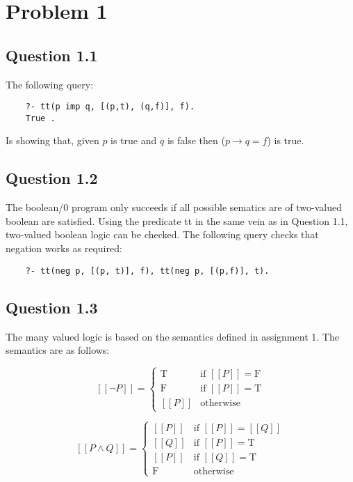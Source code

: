 \newpage
\section*{Problem 1}

\subsection*{Question 1.1}
The following query:

\begin{verbatim}
    ?- tt(p imp q, [(p,t), (q,f)], f).
    True .
\end{verbatim}

Is showing that, given $p$ is true and $q$ is false then ($p \to q = f$) is true. 

\subsection*{Question 1.2}
The boolean/0 program only succeeds if all possible sematics are of two-valued boolean are satisfied.
Using the predicate tt in the same vein as in Question 1.1, two-valued boolean logic can be checked. The following query checks that negation works as required:
\begin{verbatim}
    ?- tt(neg p, [(p, t)], f), tt(neg p, [(p,f)], t).
\end{verbatim}

\subsection*{Question 1.3}
The many valued logic is based on the semantics defined in assignment 1. The semantics are as follows:

$$ [[\neg P]] = 
    \begin{cases}
        \textrm{T} & \textrm{if } [[P]] = \textrm{F} \\
        \textrm{F} & \textrm{if } [[P]] = \textrm{T} \\
        [[P]] & \textrm{otherwise}    
    \end{cases}
$$

$$ [[P \land Q]] = 
    \begin{cases}
        [[P]] & \textrm{if } [[P]] = [[Q]] \\
        [[Q]] & \textrm{if } [[P]] = \textrm{T} \\
        [[P]] & \textrm{if } [[Q]] = \textrm{T} \\
        \textrm{F} & \textrm{otherwise} 
    \end{cases}
$$


